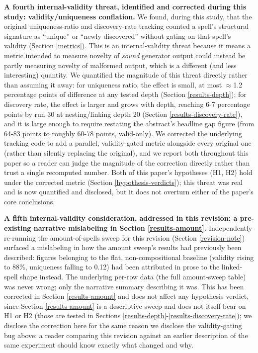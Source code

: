 \documentclass[]{article}
\begin{document}
        \textbf{A fourth internal-validity threat, identified and corrected during this study: validity/uniqueness conflation.} We found, during this study, that the original uniqueness-ratio and discovery-rate tracking counted a spell's structural signature as ``unique'' or ``newly discovered'' without gating on that spell's validity (Section \ref{metrics}). This is an internal-validity threat because it means a metric intended to measure novelty of \textit{sound} generator output could instead be partly measuring novelty of malformed output, which is a different (and less interesting) quantity. We quantified the magnitude of this threat directly rather than assuming it away: for uniqueness ratio, the effect is small, at most $\approx$1.2 percentage points of difference at any tested depth (Section \ref{results-depth}); for discovery rate, the effect is larger and grows with depth, reaching 6-7 percentage points by run 30 at nesting/linking depth 20 (Section \ref{results-discovery-rate}), and it is large enough to require restating the abstract's headline gap figure (from 64-83 points to roughly 60-78 points, valid-only). We corrected the underlying tracking code to add a parallel, validity-gated metric alongside every original one (rather than silently replacing the original), and we report both throughout this paper so a reader can judge the magnitude of the correction directly rather than trust a single recomputed number. Both of this paper's hypotheses (H1, H2) hold under the corrected metric (Section \ref{hypothesis-verdicts}); this threat was real and is now quantified and disclosed, but it does not overturn either of the paper's core conclusions.
        
        \textbf{A fifth internal-validity consideration, addressed in this revision: a pre-existing narrative mislabeling in Section \ref{results-amount}.} Independently re-running the amount-of-spells sweep for this revision (Section \ref{revision-note}) surfaced a mislabeling in how the amount sweep's results had previously been described: figures belonging to the flat, non-compositional baseline (validity rising to 88\%, uniqueness falling to 0.12) had been attributed in prose to the linked-spell shape instead. The underlying per-row data (the full amount-sweep table) was never wrong; only the narrative summary describing it was. This has been corrected in Section \ref{results-amount} and does not affect any hypothesis verdict, since Section \ref{results-amount} is a descriptive sweep and does not itself bear on H1 or H2 (those are tested in Sections \ref{results-depth}-\ref{results-discovery-rate}); we disclose the correction here for the same reason we disclose the validity-gating bug above: a reader comparing this revision against an earlier description of the same experiment should know exactly what changed and why.
        
\end{document}
